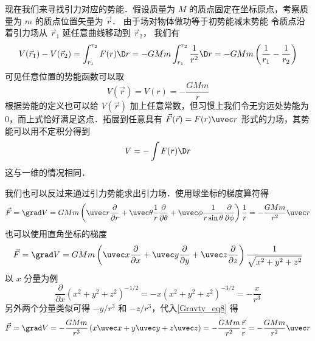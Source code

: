 现在我们来寻找引力对应的势能．假设质量为 $M$ 的质点固定在坐标原点，考察质量为 $m$ 的质点位置矢量为 $\vec r$． 由于场对物体做功等于初势能减末势能
令质点沿着引力场从 ${\vec r_1}$ 延任意曲线移动到 ${\vec r_2}$， 我们有
\begin{equation}
V({\vec r_1}) - V({\vec r_2}) = \int_{{r_1}}^{{r_2}} {F(r)\D r}  =  - GMm\int_{{r_1}}^{{r_2}} {\frac{1}{{{r^2}}}\D r}  =  - GMm\left( {\frac{1}{{{r_1}}} - \frac{1}{{{r_2}}}} \right)
\end{equation}
可见任意位置的势能函数可以取
\begin{equation}
V(\vec r) = V(r) = - \frac{{GMm}}{r}
\end{equation}
根据势能的定义也可以给 $V(\vec r)$ 加上任意常数，但习惯上我们令无穷远处势能为 0，而上式恰好满足这点．拓展到任意具有 $\vec F(\vec r) = F(r)\uvec r$ 形式的力场，其势能可以用不定积分得到
\begin{equation}
V = -\int F(r) \D r
\end{equation}
这与一维的情况相同．%

我们也可以反过来通过引力势能求出引力场．使用球坐标的梯度算符得%
\begin{equation}
\vec F = \grad V = GMm\left( {\uvec r\frac{\partial }{{\partial r}} + \uvec \theta \frac{1}{r}\frac{\partial }{{\partial \theta }} + \uvec \phi \frac{1}{{r\sin \theta }}\frac{\partial }{{\partial \phi }}} \right)\frac{1}{r} =  - \frac{{GMm}}{{{r^2}}}\uvec r
\end{equation}
也可以使用直角坐标的梯度
\begin{equation}\label{Gravty_eq8}
\vec F = \grad V = GMm\left( {\uvec x\frac{\partial }{{\partial x}} + \uvec y\frac{\partial }{{\partial y}} + \uvec z\frac{\partial }{{\partial z}}} \right)\frac{1}{{\sqrt {{x^2} + {y^2} + {z^2}} }}
\end{equation}
以 $x$ 分量为例
\begin{equation}
\frac{\partial }{{\partial x}}{({x^2} + {y^2} + {z^2})^{ - 1/2}} =  - x{({x^2} + {y^2} + {z^2})^{ - 3/2}} =  - \frac{x}{{{r^3}}}
\end{equation}
另外两个分量类似可得 $- y/{r^3}$ 和 $- z/{r^3}$，代入\autoref{Gravty_eq8} 得
\begin{equation}
\vec F = \grad V =  - \frac{{GMm}}{{{r^3}}}\left( {x\uvec x + y\uvec y + z\uvec z} \right) =  - \frac{{GMm}}{{{r^2}}}\frac{{\vec r}}{r} =  - \frac{{GMm}}{{{r^2}}}\uvec r
\end{equation}
